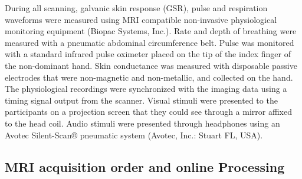 During all scanning, galvanic skin response (GSR), pulse and respiration waveforms were measured using MRI compatible non-invasive physiological monitoring equipment (Biopac Systems, Inc.). Rate and depth of breathing were measured with a pneumatic abdominal circumference belt. Pulse was monitored with a standard infrared pulse oximeter placed on the tip of the index finger of the non-dominant hand. Skin conductance was measured with disposable passive electrodes that were non-magnetic and non-metallic, and collected on the hand. The physiological recordings were synchronized with the imaging data using a timing signal output from the scanner. Visual stimuli were presented to the participants on a projection screen that they could see through a mirror affixed to the head coil. Audio stimuli were presented through headphones using an Avotec Silent-Scan® pneumatic system (Avotec, Inc.: Stuart FL, USA).

\subsection{MRI acquisition order and online Processing}

